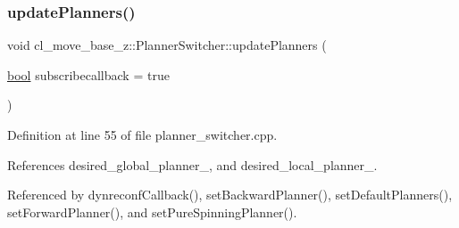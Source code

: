 \subsubsection{\texorpdfstring{update\+Planners()}{updatePlanners()}}
{\footnotesize\ttfamily void cl\+\_\+move\+\_\+base\+\_\+z\+::\+Planner\+Switcher\+::update\+Planners (\begin{DoxyParamCaption}\item[{\hyperlink{classbool}{bool}}]{subscribecallback = {\ttfamily true} }\end{DoxyParamCaption})\hspace{0.3cm}{\ttfamily [private]}}



Definition at line 55 of file planner\+\_\+switcher.\+cpp.



References desired\+\_\+global\+\_\+planner\+\_\+, and desired\+\_\+local\+\_\+planner\+\_\+.



Referenced by dynreconf\+Callback(), set\+Backward\+Planner(), set\+Default\+Planners(), set\+Forward\+Planner(), and set\+Pure\+Spinning\+Planner().



